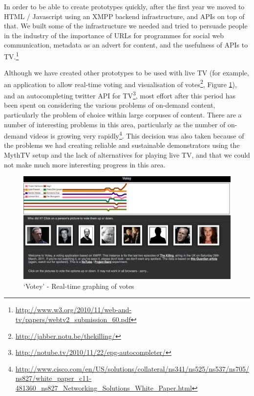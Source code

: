 \documentclass{notube}
\begin{document}
In order to be able to create prototypes quickly, after the first year we moved to HTML / Javascript using an XMPP backend infrastructure, and APIs on top of that. We built some of the infrastructure we needed and tried to persuade people in the industry of the importance of URLs for programmes for social web communication, metadata as an advert for content, and the usefulness of APIs to TV.\footnote{\url{http://www.w3.org/2010/11/web-and-tv/papers/webtv2_submission_60.pdf}}

Although we have created other prototypes to be used with live TV (for example, an application to allow real-time voting and visualisation of votes\footnote{\url{http://jabber.notu.be/thekilling/}}, Figure \ref{fig:votey}), and an autocompleting twitter API for TV\footnote{\url{http://notube.tv/2010/11/22/epg-autocompleter/}}, most effort after this period has been spent on considering the various problems of on-demand content, particularly the problem of choice within large corpuses of content. There are a number of interesting problems in this area, particularly as the number of on-demand videos is growing very rapidly\footnote{\url{http://www.cisco.com/en/US/solutions/collateral/ns341/ns525/ns537/ns705/ns827/white_paper_c11-481360_ns827_Networking_Solutions_White_Paper.html}}. This decision was also taken because of the problems we had creating reliable and sustainable demonstrators using the MythTV setup and the lack of alternatives for playing live TV, and that we could not make much more interesting progress in this area.


\begin{figure}[htbp]
\begin{center}
\includegraphics[width=6in]{images/votey.png}
\caption{`Votey' - Real-time graphing of votes} \label{fig:votey}
\end{center}
\end{figure} 
\end{document}
